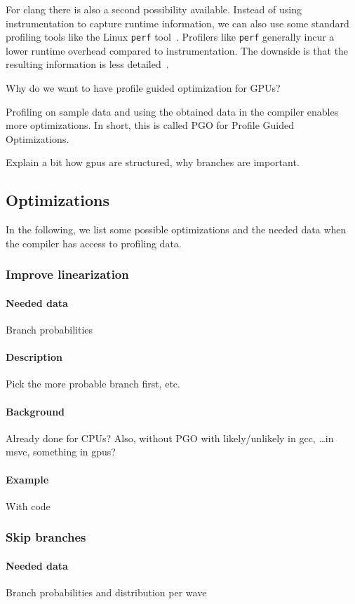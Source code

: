 For clang there is also a second possibility available. Instead of using instrumentation to capture runtime information, we can also use some standard profiling tools like the Linux \texttt{perf} tool~\cite{LinuxPerf}. Profilers like \texttt{perf} generally incur a lower runtime overhead compared to instrumentation. The downside is that the resulting information is less detailed~\cite{ClangManual}.

Why do we want to have profile guided optimization for GPUs?

Profiling on sample data and using the obtained data in the compiler enables more optimizations. In short, this is called PGO for Profile Guided Optimizations.

Explain a bit how \glspl{gpu} are structured, why branches are important.

\subsection{Optimizations}
In the following, we list some possible optimizations and the needed data when the compiler has access to profiling data.

\subsubsection{Improve linearization}
\paragraph{Needed data} Branch probabilities
\paragraph{Description} Pick the more probable branch first, etc.
\paragraph{Background} Already done for CPUs? Also, without PGO with likely/unlikely in gcc, \dots in msvc, something in gpus?
\paragraph{Example} With code

\subsubsection{Skip branches}
\paragraph{Needed data} Branch probabilities and distribution per wave
